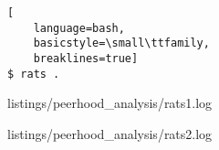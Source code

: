 \ApplyOnePageAppendixPageStyle{}

\begin{lstlisting}[
	language=bash,
	basicstyle=\small\ttfamily,
	breaklines=true]
$ rats .
\end{lstlisting}

\ApplyAppendixFirstPageStyle{}


	{listings/peerhood_analysis/rats1.log}

\newpage
\ApplyAppendixLastPageStyle{}


	{listings/peerhood_analysis/rats2.log}